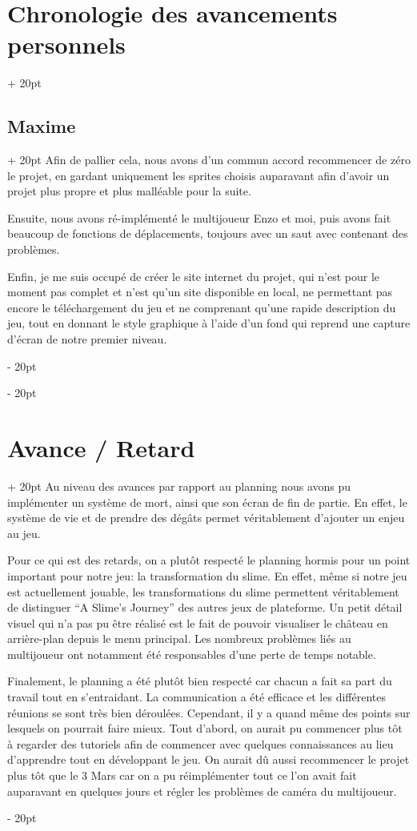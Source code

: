 \documentclass[a4paper, 12pt, twoside]{article}
\newcommand{\ind}[1][20pt]{\advance\leftskip + #1}
\newcommand{\deind}[1][20pt]{\advance\leftskip - #1}
\newenvironment{indt}[2][20pt]{#2 \par \ind[#1]}{\par \deind} %
\begin{document}
\begin{indt}{\section{Chronologie des avancements personnels}}
\begin{indt}{\subsection{Maxime}}
            Afin de pallier cela, nous avons d'un commun accord recommencer de zéro le projet, en gardant uniquement les sprites choisis auparavant afin d'avoir un projet plus propre et plus malléable pour la suite. 
            
            Ensuite, nous avons ré-implémenté le multijoueur Enzo et moi, puis avons fait beaucoup de fonctions de déplacements, toujours avec un saut avec contenant des problèmes. 

            Enfin, je me suis occupé de créer le site internet du projet, qui n'est pour le moment pas complet et n'est qu'un site disponible en local, ne permettant pas encore le téléchargement du jeu et ne comprenant qu'une rapide description du jeu, tout en donnant le style graphique à l'aide d'un fond qui reprend une capture d'écran de notre premier niveau.
        \end{indt}
    \end{indt}
    
    \begin{indt}{\section{Avance / Retard}}
        Au niveau des avances par rapport au planning nous avons pu implémenter un système de mort, ainsi que son écran de fin de partie. En effet, le système de vie et de prendre des dégâts permet véritablement d'ajouter un enjeu au jeu. 

	    Pour ce qui est des retards, on a plutôt respecté le planning hormis pour un point important pour notre jeu: la transformation du slime. En effet, même si notre jeu est actuellement jouable, les transformations du slime permettent véritablement de distinguer “A Slime's Journey” des autres jeux de plateforme. Un petit détail visuel qui n'a pas pu être réalisé est le fait de pouvoir visualiser le château  en arrière-plan depuis le menu principal. Les nombreux problèmes liés au multijoueur ont notamment été responsables d'une perte de temps notable.

	    Finalement, le planning a été plutôt bien respecté car chacun a fait sa part du travail tout en s'entraidant. La communication a été efficace et les différentes réunions se sont très bien déroulées. Cependant, il y a quand même des points sur lesquels on pourrait faire mieux. Tout d'abord, on aurait pu commencer plus tôt à regarder des tutoriels afin de commencer avec quelques connaissances au lieu d'apprendre tout en développant le jeu. On aurait dû aussi recommencer le projet plus tôt que le 3 Mars car on a pu réimplémenter tout ce l'on avait fait auparavant en quelques jours et régler les problèmes de caméra du multijoueur.

    \end{indt}
\end{document}
